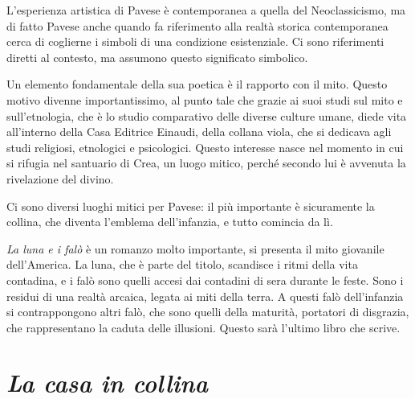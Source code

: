 \documentclass[a4paper, twoside, titlepage]{book}
\begin{document}
L'esperienza artistica di Pavese è contemporanea a quella del Neoclassicismo, ma di fatto Pavese anche quando fa riferimento alla realtà storica contemporanea cerca di coglierne i simboli di una condizione esistenziale.
Ci sono riferimenti diretti al contesto, ma assumono questo significato simbolico. 

Un elemento fondamentale della sua poetica è il rapporto con il mito. Questo motivo divenne importantissimo, al punto tale che grazie ai suoi studi sul mito e sull'etnologia, che è lo studio comparativo delle diverse culture umane, diede vita all'interno della Casa Editrice Einaudi, della collana viola, che si dedicava agli studi religiosi, etnologici e psicologici.
Questo interesse nasce nel momento in cui si rifugia nel santuario di Crea, un luogo mitico, perché secondo lui è avvenuta la rivelazione del divino.

Ci sono diversi luoghi mitici per Pavese: il più importante è sicuramente la collina, che diventa l'emblema dell'infanzia, e tutto comincia da lì.

\textit{La luna e i falò} è un romanzo molto importante, si presenta il mito giovanile dell'America.
La luna, che è parte del titolo, scandisce i ritmi della vita contadina, e i falò sono quelli accesi dai contadini di sera durante le feste. Sono i residui di una realtà arcaica, legata ai miti della terra.
A questi falò dell'infanzia si contrappongono altri falò, che sono quelli della maturità, portatori di disgrazia, che rappresentano la caduta delle illusioni.
Questo sarà l'ultimo libro che scrive.

\section{\textit{La casa in collina}}
\end{document}
